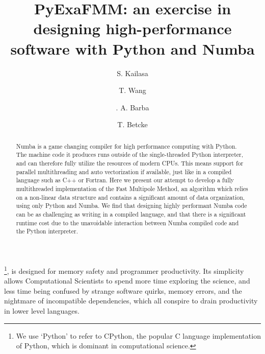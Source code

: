 \documentclass{IEEEcsmag}
\begin{document}

\title{PyExaFMM: an exercise in designing high-performance software with Python and Numba}

\author{S. Kailasa}

\author{T. Wang}

\author{. A. Barba}

\author{T. Betcke}


\begin{abstract}
    Numba is a game changing compiler for high performance computing with Python. The machine code it produces runs outside of the single-threaded Python interpreter, and can therefore fully utilize the resources of modern CPUs. This means support for parallel multithreading and auto vectorization if available, just like in a compiled language such as C++ or Fortran. Here we present our attempt to develop a fully multithreaded implementation of the Fast Multipole Method, an algorithm which relies on a non-linear data structure and contains a significant amount of data organization, using only Python and Numba. We find that designing highly performant Numba code can be as challenging as writing in a compiled language, and that there is a significant runtime cost due to the unavoidable interaction between Numba compiled code and the Python interpreter.
\end{abstract}

\maketitle
{}\footnote{We use `Python' to refer to CPython, the popular C language implementation of Python, which is dominant in computational science.}, is designed for memory safety and programmer productivity. Its simplicity allows Computational Scientists to spend more time exploring the science, and less time being confused by strange software quirks, memory errors, and the nightmare of incompatible dependencies, which all conspire to drain productivity in lower level languages.
\end{document}
